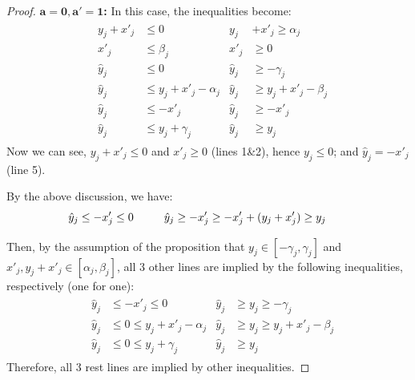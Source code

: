 \begin{proof}[Proof]
	
\textbf{$\mathbf{a = 0, a' = 1}$:}  In this case, the inequalities become: \begin{align*}
	& \begin{aligned}
		y_j + x'_j &\leq 0        &
		y_j &+ x'_j \geq \alpha_j \\
		x'_j       &\leq \beta_j       & 
		x'_j       &\geq 0 \\
		\hat{y}_j  &\leq 0      &
		\hat{y}_j  &\geq -\gamma_j \\
		\hat{y}_j  &\leq y_j + x'_j - \alpha_j &
		\hat{y}_j  &\geq y_j + x'_j  -\beta_j\\
		\hat{y}_j  &\leq -x'_j &
		\hat{y}_j  &\geq -x'_j \\
		\hat{y}_j  &\leq y_j + \gamma_j  &
		\hat{y}_j  &\geq y_j
	\end{aligned}
\end{align*} Now we can see, $y_j+x'_j\leq 0$ and $x'_j \geq 0$ (lines 1\&2), hence $y_j \leq 0$; and $\hat{y}_j= - x'_j$ (line 5). 

By the above discussion,  we have: \begin{align*}
	& \begin{aligned}
		\hat{y}_j  &\leq -x'_j\leq 0      & \hspace*{4ex}
		\hat{y}_j  &\geq -x'_j \geq -x'_j+(y_j+x'_j) \geq y_j
	\end{aligned}
\end{align*}

Then, by the assumption of the proposition that $y_j \in [-\gamma_j, \gamma_j]$ and $x'_j,y_j+x'_j \in [\alpha_j,\beta_j]$, all 3 other lines are implied by the following inequalities, respectively (one for one):\begin{align*}
	& \begin{aligned}
		\hat{y}_j  &\leq -x'_j\leq 0      &
		\hat{y}_j  &\geq y_j\geq -\gamma_j \\
		\hat{y}_j  &\leq 0 \leq y_j + x'_j - \alpha_j &
		\hat{y}_j  &\geq y_j \geq y_j + x'_j -\beta_j \\
		\hat{y}_j  &\leq 0 \leq y_j + \gamma_j  &
		\hat{y}_j  &\geq  y_j
	\end{aligned}
\end{align*}Therefore, all 3 rest lines are implied by other inequalities.





\end{proof}
